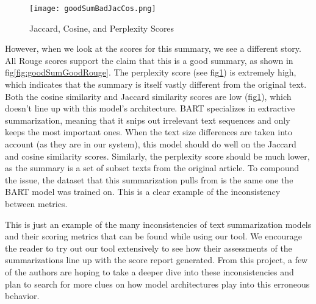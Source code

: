 \begin{figure}[ht]
    \centering
    \texttt{[image: goodSumBadJacCos.png]}
    \caption{Jaccard, Cosine, and Perplexity Scores}
    \label{fig:goodSumBadJacCos}
\end{figure}



\vspace{5pt}

However, when we look at the scores for this summary, we see a different story.
All Rouge scores support the claim that this is a good summary, as shown in fig\ref{fig:goodSumGoodRouge}.
The perplexity score (see fig\ref{fig:goodSumBadJacCos}) is extremely high, which indicates that the summary is itself vastly different from the original text.
Both the cosine similarity and Jaccard similarity scores are low (fig\ref{fig:goodSumBadJacCos}), which doesn't line up with this model's architecture.
BART specializes in extractive summarization, meaning that it snips out irrelevant text sequences and only keeps the most important ones.
When the text size differences are taken into account (as they are in our system), this model should do well on the Jaccard and cosine similarity scores.
Similarly, the perplexity score should be much lower, as the summary is a set of subset texts from the original article.
To compound the issue, the dataset that this summarization pulls from is the same one the BART model was trained on.
This is a clear example of the inconsistency between metrics. 

\vspace{5pt}

This is just an example of the many inconsistencies of text summarization models and their scoring metrics that can be found while using our tool.
We encourage the reader to try out our tool extensively to see how their assessments of the summarizations line up with the score report generated.
From this project, a few of the authors are hoping to take a deeper dive into these inconsistencies and plan to search for more clues on how model architectures play into this erroneous behavior.

\pagebreak
